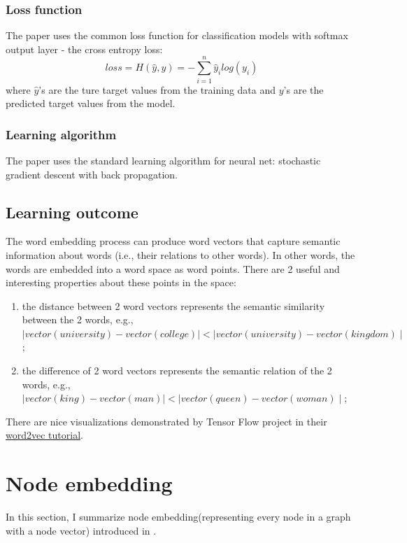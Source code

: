 \documentclass{article}
\begin{document}
\subsubsection{Loss function}
The paper uses the common loss function for classification models with softmax output layer - the cross entropy loss:
\begin{equation}
loss = H(\hat{y}, y) = - \sum_{i = 1}^{n} \hat{y}_i log(y_i)
\end{equation}
where $ \hat{y} $'s are the ture target values from the training data and $ y $'s are the predicted target values from the model.

\subsubsection{Learning algorithm}
The paper uses the standard learning algorithm for neural net: stochastic gradient descent with back propagation\cite{lecun2012efficient}.

\subsection{Learning outcome}
The word embedding process can produce word vectors that capture semantic information about words (i.e., their relations to other words). In other words, the words are embedded into a word space as word points. There are 2 useful and interesting properties about these points in the space:
\begin{enumerate}
	\item the distance between 2 word vectors represents the semantic similarity between the 2 words, e.g., $ \mid vector(university) - vector(college) \mid < \mid vector(university) - vector(kingdom) \mid $;
	\item the difference of 2 word vectors represents the semantic relation of the 2 words, e.g., $ \mid vector(king) - vector(man) \mid < \mid vector(queen) - vector(woman) \mid $;
\end{enumerate}
There are nice visualizations demonstrated by Tensor Flow project in their \href{https://www.tensorflow.org/versions/r0.7/tutorials/word2vec/index.html}{word2vec tutorial}.

\section{Node embedding}

In this section, I summarize node embedding(representing every node in a graph with a node vector) introduced in \cite{perozzi2014deepwalk}.
\end{document}
